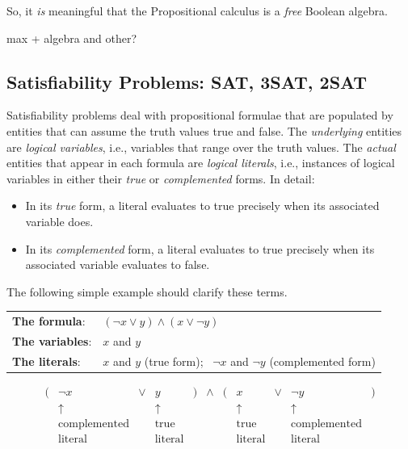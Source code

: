 So, it {\em is} meaningful that the Propositional calculus is a {\em
  free} Boolean algebra.
  
  {\Denis max + algebra and other?}


\subsection{Satisfiability Problems: {\sf SAT}, {\sf 3SAT}, {\sf 2SAT}}
\label{sec:Satisfiability}

Satisfiability problems deal with propositional formulae that are
populated by entities that can assume the truth values {\sc
  true} and {\sc false}. 
The {\em underlying} entities are {\it logical variables},
i.e., variables that range over the truth values.  The {\em actual}
entities that appear in each formula are {\it logical literals}, 
i.e., instances of logical variables in either their {\em true} or
{\em complemented} forms.
In detail:
\begin{itemize}
\item
In its {\em true} form, a literal evaluates to {\sc true}
precisely when its associated variable does.
\item
In its {\em complemented} form, a literal evaluates to {\sc
  true} precisely when its associated variable evaluates to {\sc
  false}.
\end{itemize}
The following simple example should clarify these terms.

\begin{tabular}{ll}
{\bf The formula}:  & $(\neg {x} \vee y) \wedge (x \vee \neg{y})$ \\
{\bf The variables}: & $x$ and $y$ \\
{\bf The literals}:  & $x$ and $y$ (true form); \ $\neg {x}$ and $\neg {y}$
(complemented form)
\end{tabular}
\[
\begin{array}{ccccccccccc}
( & \neg {x} & \vee & y & ) & \wedge & ( & x & \vee & \neg{y} & ) \\
  & \uparrow &     & \uparrow & & & & \uparrow & & \uparrow & \\
  & \mbox{complemented} &  & \mbox{true}  & & & & \mbox{true} &
        & \mbox{complemented} &  \\
  & \mbox{literal} & & \mbox{literal} & & & & \mbox{literal} & &
  \mbox{literal} & 
\end{array}
\]


